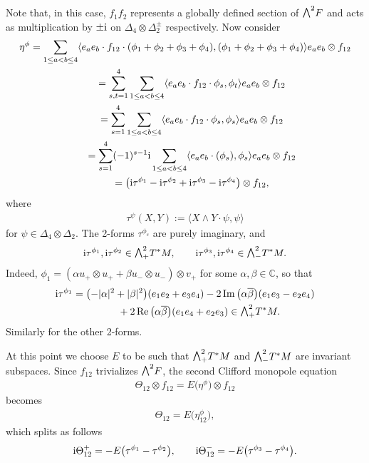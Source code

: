 \documentclass[pdftex]{sigma}
\newcommand{\ext}{\raise1pt\hbox{\small$\bigwedge$}}
\numberwithin{equation}{section}
\begin{document}
{\allowdisplaybreaks
Note that, in this case, $f_1f_2$ represents a globally defined section of $\ext^2 F$ and acts as multiplication by $\pm {\rm i}$ on $\Delta_4\otimes\Delta_2^\pm$ respectively. Now consider
\begin{gather*}
\eta^\phi = \sum_{1\leq a<b\leq 4}\langle e_ae_b\cdot f_{12}\cdot (\phi_1+\phi_2+\phi_3+\phi_4),
 (\phi_1+\phi_2+\phi_3+\phi_4)\rangle e_ae_b\otimes f_{12}\\
\hphantom{\eta^\phi}{}= \sum_{s,t=1}^4 \sum_{1\leq a<b\leq 4}\langle e_ae_b\cdot f_{12}\cdot \phi_s,\phi_t\rangle e_ae_b\otimes f_{12}\\
\hphantom{\eta^\phi}{} = \sum_{s=1}^4 \sum_{1\leq a<b\leq 4}\langle e_ae_b\cdot f_{12}\cdot \phi_s,\phi_s\rangle e_ae_b\otimes f_{12}\\
\hphantom{\eta^\phi}{}= \sum_{s=1}^4(-1)^{s-1}{\rm i}\sum_{1\leq a<b\leq 4}\langle e_ae_b\cdot (\phi_s),\phi_s\rangle e_ae_b\otimes f_{12}\\
\hphantom{\eta^\phi}{} = \big({\rm i}\tau^{\phi_1} - {\rm i}\tau^{\phi_2} + {\rm i}\tau^{\phi_3} - {\rm i}\tau^{\phi_4}\big) \otimes f_{12} ,
\end{gather*}
where
\begin{gather*}\tau^{\psi}(X,Y):=\langle X\wedge Y\cdot\psi,\psi\rangle \end{gather*}
for $\psi\in\Delta_4\otimes\Delta_2$. The 2-forms $\tau^{\phi_s}$ are purely imaginary, and
\begin{gather*}{\rm i}\tau^{\phi_1},{\rm i}\tau^{\phi_2}\in \ext^2_+T^*M,\qquad {\rm i}\tau^{\phi_3},{\rm i}\tau^{\phi_4}\in \ext^2_-T^*M.\end{gather*}
Indeed, $\phi_1=(\alpha u_+\otimes u_+ + \beta u_-\otimes u_- )\otimes v_+ $ for some $\alpha,\beta\in\mathbb{C}$, so that
\begin{gather*}{\rm i}\tau^{\phi_1}=
\big({-}|\alpha|^2+|\beta|^2\big)(e_1e_2+e_3e_4) -2\operatorname{Im}\big(\alpha\overline{\beta}\big)(e_1e_3-e_2e_4)\\
\hphantom{{\rm i}\tau^{\phi_1}=}{}
+2\operatorname{Re}\big(\alpha\overline{\beta}\big)(e_1e_4+e_2e_3)\in\ext^2_+T^*M.
\end{gather*}
Similarly for the other 2-forms.

}

At this point we choose $E$ to be such that $\ext^2_+T^*M$ and $\ext^2_-T^*M$ are invariant subspaces. Since $f_{12}$ trivializes $\ext^2 F$, the second Clifford monopole equation
\begin{gather*}\Theta_{12}\otimes f_{12} = E\big(\eta^{\phi}\big)\otimes f_{12}\end{gather*}
becomes
\begin{gather*}\Theta_{12} = E\big(\eta_{12}^\phi\big),\end{gather*}
which splits as follows
\begin{gather*}
{\rm i}\Theta_{12}^+ = -E\big(\tau^{\phi_1}-\tau^{\phi_2}\big),\qquad
{\rm i}\Theta_{12}^- = -E\big(\tau^{\phi_3}-\tau^{\phi_4}\big).
\end{gather*}
\end{document}
